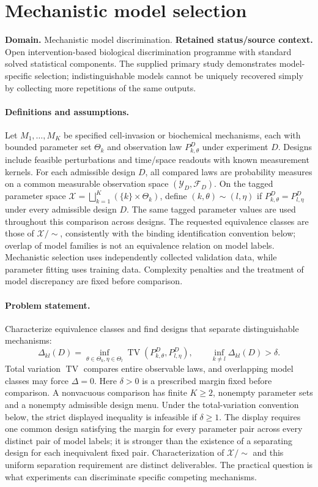 \documentclass[11pt]{article}
\begin{document}
\section*{Mechanistic model selection}
\label{prob:045}
\label{rank:218}
\par\smallskip

\noindent\textbf{Domain.} Mechanistic model discrimination. \quad \textbf{Retained status/source context.} Open intervention-based biological discrimination programme with standard solved statistical components. The supplied primary study demonstrates model-specific selection; indistinguishable models cannot be uniquely recovered simply by collecting more repetitions of the same outputs.
\paragraph{Definitions and assumptions.} Let $M_1,\ldots,M_K$ be specified cell-invasion or biochemical mechanisms, each with bounded parameter set $\Theta_k$ and observation law $P_{k,\theta}^D$ under experiment $D$. Designs include feasible perturbations and time/space readouts with known measurement kernels. For each admissible design $D$, all compared laws are probability measures on a common measurable observation space $(\mathcal Y_D,\mathcal F_D)$. On the tagged parameter space $\mathcal X=\bigsqcup_{k=1}^K(\{k\}\times\Theta_k)$, define $(k,\theta)\sim(l,\eta)$ if $P_{k,\theta}^D=P_{l,\eta}^D$ under every admissible design $D$. The same tagged parameter values are used throughout this comparison across designs. The requested equivalence classes are those of $\mathcal X/\sim$, consistently with the binding identification convention below; overlap of model families is not an equivalence relation on model labels. Mechanistic selection uses independently collected validation data, while parameter fitting uses training data. Complexity penalties and the treatment of model discrepancy are fixed before comparison.
\paragraph{Problem statement.} Characterize equivalence classes and find designs that separate distinguishable mechanisms:
\[
\Delta_{kl}(D)=\inf_{\theta\in\Theta_k,\eta\in\Theta_l}
\operatorname{TV}(P_{k,\theta}^D,P_{l,\eta}^D),
\qquad\inf_{k\ne l}\Delta_{kl}(D)>\delta.
\]
Total variation $\operatorname{TV}$ compares entire observable laws, and overlapping model classes may force $\Delta=0$. Here $\delta>0$ is a prescribed margin fixed before comparison. A nonvacuous comparison has finite $K\ge2$, nonempty parameter sets and a nonempty admissible design menu. Under the total-variation convention below, the strict displayed inequality is infeasible if $\delta\ge1$. The display requires one common design satisfying the margin for every parameter pair across every distinct pair of model labels; it is stronger than the existence of a separating design for each inequivalent fixed pair. Characterization of $\mathcal X/\sim$ and this uniform separation requirement are distinct deliverables. The practical question is what experiments can discriminate specific competing mechanisms.
\end{document}

